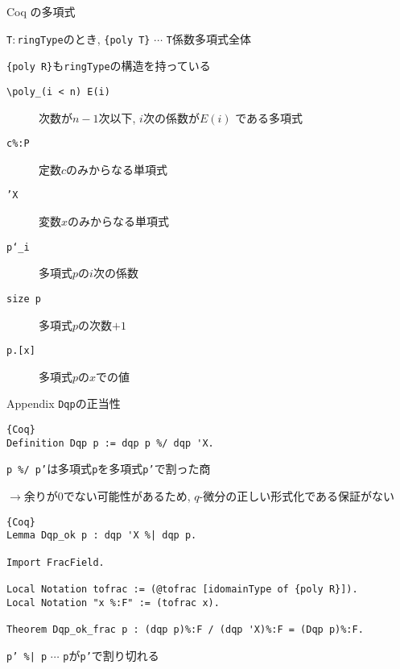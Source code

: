\documentclass[dvipdfmx,cjk]{beamer}
\theoremstyle{mystyle}
\newcommand{\0}{\textbf{0}}
\begin{document}
\begin{frame}{Coq の多項式}

	{\tt T}$\colon${\tt ringType}のとき, {\tt \{poly T\}} $\cdots$ {\tt T}係数多項式全体 
	
	{\tt \{poly R\}}も{\tt ringType}の構造を持っている
	\begin{description}
	  \item[\tt \textbackslash poly\_(i < n) E(i)] 次数が$n - 1$次以下, $i$次の係数が$E(i)$
	    である多項式
	  \item[\tt c\%:P] 定数$c$のみからなる単項式
	  \item[\tt 'X] 変数$x$のみからなる単項式
	  \item[\tt p`\_i] 多項式$p$の$i$次の係数 
	  \item[\tt size p] 多項式$p$の次数$+1$
	  \item[{\tt p.[x]}] 多項式$p$の$x$での値 
	\end{description}
\end{frame}

\begin{frame}[fragile]{Appendix {\tt Dqp}の正当性}
	\begin{lstlisting}{Coq}
Definition Dqp p := dqp p %/ dqp 'X.
\end{lstlisting}
	{\tt p \%/ p'}は多項式{\tt p}を多項式{\tt p'}で割った商
	
	$\to$余りが$0$でない可能性があるため, $q$-微分の正しい形式化である保証がない
	\begin{lstlisting}{Coq}
Lemma Dqp_ok p : dqp 'X %| dqp p.

Import FracField.

Local Notation tofrac := (@tofrac [idomainType of {poly R}]).
Local Notation "x %:F" := (tofrac x).

Theorem Dqp_ok_frac p : (dqp p)%:F / (dqp 'X)%:F = (Dqp p)%:F.
\end{lstlisting}
	{\tt p' \%| p} $\cdots$ {\tt p}が{\tt p'}で割り切れる
\end{frame}
\end{document}
